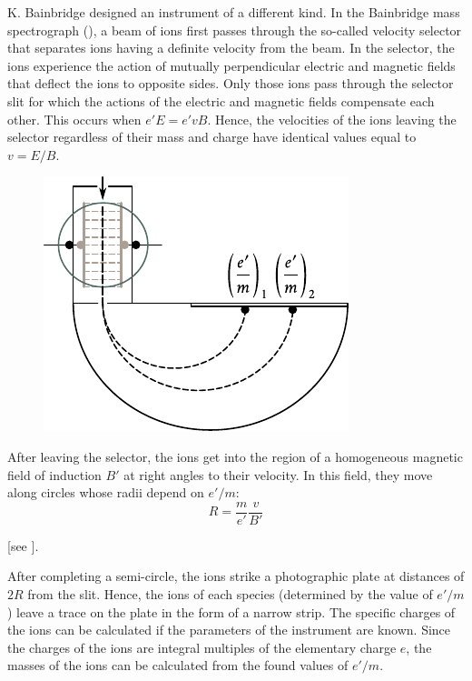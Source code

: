 K. Bainbridge designed an instrument of a different kind.
In the Bainbridge mass spectrograph (), a beam of ions first passes through the so-called velocity selector that separates ions having a definite velocity from the beam.
In the selector, the ions experience the action of mutually perpendicular electric and magnetic fields that deflect the ions to opposite sides.
Only those ions pass through the selector slit for which the actions of the electric and magnetic fields compensate each other.
This occurs when $e'E = e'vB$.
Hence, the velocities of the ions leaving the selector regardless of their mass and charge have identical values equal to $v = E/B$.

\begin{figure}[t]
	\begin{center}
		\includegraphics[scale=1]{figures/ch_10/fig_10_13.pdf}
		\caption[]{}
		\label{fig:10_13}
	\end{center}
	\vspace{-0.8cm}
\end{figure}

After leaving the selector, the ions get into the region of a homogeneous magnetic field of induction $B'$ at right angles to their velocity.
In this field, they move along circles whose radii depend on $e'/m$:
\begin{equation*}
    R = \frac{m}{e'}\frac{v}{B'}
\end{equation*}

[see ].

After completing a semi-circle, the ions strike a photographic plate at distances of $2R$ from the slit.
Hence, the ions of each species (determined by the value of $e'/m$) leave a trace on the plate in the form of a narrow strip.
The specific charges of the ions can be calculated if the parameters of the instrument are known.
Since the charges of the ions are integral multiples of the elementary charge $e$, the masses of the ions can be calculated from the found values of $e'/m$.

